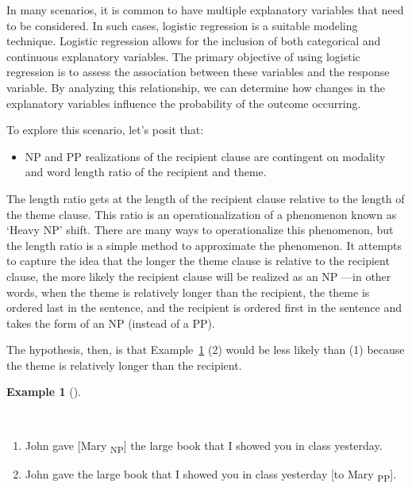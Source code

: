 \documentclass[
  letterpaper,
  krantz1]{latex/krantz-mod}
\providecommand{\tightlist}{%
  \setlength{\itemsep}{0pt}\setlength{\parskip}{0pt}}\usepackage{longtable,booktabs,array}
\theoremstyle{definition}
\theoremstyle{definition}
\newtheorem{example}{Example}[chapter]
\theoremstyle{remark}
\begin{document}
In many scenarios, it is common to have multiple explanatory
variables that need to be considered. In
such cases, logistic regression is a suitable modeling technique.
Logistic regression allows for the inclusion
of both categorical and continuous explanatory variables. The primary
objective of using logistic regression is to assess the association
between these variables and the response variable. By analyzing this
relationship, we can determine how changes in the explanatory variables
influence the probability of the outcome occurring.

To explore this scenario, let's posit that:

\begin{itemize}
\tightlist
\item
  NP and PP realizations of the recipient clause are contingent on
  modality and word length ratio of the recipient and
  theme.
\end{itemize}

The length ratio gets at the length of the recipient clause relative to
the length of the theme clause. This ratio is an
operationalization of a phenomenon known as `Heavy
NP' shift. There are many ways to operationalize this phenomenon, but
the length ratio is a simple method to approximate the phenomenon. It
attempts to capture the idea that the longer the theme clause is
relative to the recipient clause, the more likely the recipient clause
will be realized as an NP ---in other words, when the theme is
relatively longer than the recipient, the theme is ordered last in the
sentence, and the recipient is ordered first in the sentence and takes
the form of an NP (instead of a PP).

The hypothesis, then, is that Example~\ref{exm-heavy-np-shift} (2) would
be less likely than (1) because the theme is relatively longer than the
recipient.

\begin{example}[]\protect\hypertarget{exm-heavy-np-shift}{}\label{exm-heavy-np-shift}

~

\begin{enumerate}
\def\labelenumi{(\arabic{enumi})}
\tightlist
\item
  John gave {[}Mary \textsubscript{NP}{]} the large book that I showed
  you in class yesterday.
\item
  John gave the large book that I showed you in class yesterday {[}to
  Mary \textsubscript{PP}{]}.
\end{enumerate}

\end{example}
\end{document}
